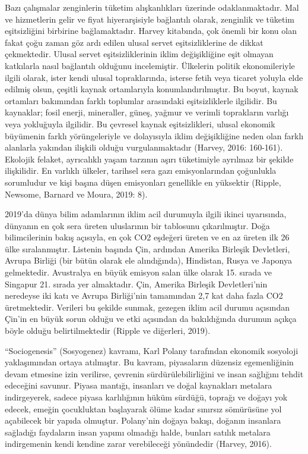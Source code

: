 \documentclass[
]{book}
\begin{document}
Bazı çalışmalar zenginlerin tüketim alışkanlıkları üzerinde odaklanmaktadır. Mal ve hizmetlerin gelir ve fiyat hiyerarşisiyle bağlantılı olarak, zenginlik ve tüketim eşitsizliğini birbirine bağlamaktadır. Harvey kitabında, çok önemli bir konu olan fakat çoğu zaman göz ardı edilen ulusal servet eşitsizliklerine de dikkat çekmektedir. Ulusal servet eşitsizliklerinin iklim değişikliğine eşit olmayan katkılarla nasıl bağlantılı olduğunu incelemiştir. Ülkelerin politik ekonomileriyle ilgili olarak, ister kendi ulusal topraklarında, isterse fetih veya ticaret yoluyla elde edilmiş olsun, çeşitli kaynak ortamlarıyla konumlandırılmıştır. Bu boyut, kaynak ortamları bakımından farklı toplumlar arasındaki eşitsizliklerle ilgilidir. Bu kaynaklar; fosil enerji, mineraller, güneş, yağmur ve verimli toprakların varlığı veya yokluğuyla ilgilidir. Bu çevresel kaynak eşitsizlikleri, ulusal ekonomik büyümenin farklı yörüngeleriyle ve dolayısıyla iklim değişikliğine neden olan farklı alanlarla yakından ilişkili olduğu vurgulanmaktadır (Harvey, 2016: 160-161). Ekolojik felaket, ayrıcalıklı yaşam tarzının aşırı tüketimiyle ayrılmaz bir şekilde ilişkilidir. En varlıklı ülkeler, tarihsel sera gazı emisyonlarından çoğunlukla sorumludur ve kişi başına düşen emisyonları genellikle en yüksektir (Ripple, Newsome, Barnard ve Moura, 2019: 8).

2019'da dünya bilim adamlarının iklim acil durumuyla ilgili ikinci uyarısında, dünyanın en çok sera üreten uluslarının bir tablosunu çıkarılmıştır. Doğa bilimcilerinin bakış açısıyla, en çok CO2 eşdeğeri üreten ve en az üreten ilk 26 ülke sıralanmıştır. Listenin başında Çin, ardından Amerika Birleşik Devletleri, Avrupa Birliği (bir bütün olarak ele alındığında), Hindistan, Rusya ve Japonya gelmektedir. Avustralya en büyük emisyon salan ülke olarak 15. sırada ve Singapur 21. sırada yer almaktadır. Çin, Amerika Birleşik Devletleri'nin neredeyse iki katı ve Avrupa Birliği'nin tamamından 2,7 kat daha fazla CO2 üretmektedir. Verileri bu şekilde sunmak, gezegen iklim acil durumu açısından Çin'in en büyük sorun olduğu ve etki açısından da bakıldığında durumun açıkça böyle olduğu belirtilmektedir (Ripple ve diğerleri, 2019).

``Sociogenesis'' (Sosyogenez) kavramı, Karl Polany tarafından ekonomik sosyoloji yaklaşımından ortaya atılmıştır. Bu kavram, piyasaların düzensiz egemenliğinin devam etmesine izin verilirse, çevrenin sürdürülebilirliğini ve insan sağlığını tehdit edeceğini savunur. Piyasa mantığı, insanları ve doğal kaynakları metalara indirgeyerek, sadece piyasa karlılığının hüküm sürdüğü, toprağı ve doğayı yok edecek, emeğin çocukluktan başlayarak ölüme kadar sınırsız sömürüsüne yol açabilecek bir yapıda olmuştur. Polany'nin doğaya bakışı, doğanın insanlara sağladığı faydaların insan yapımı olmadığı halde, bunları satılık metalara indirgemenin kendi kendine zarar verebileceği yönündedir (Harvey, 2016).
\end{document}
